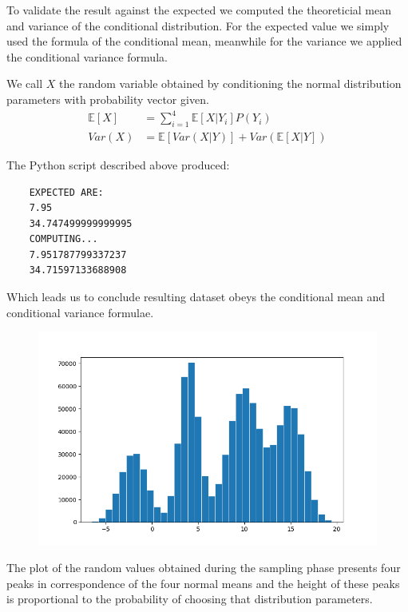 \documentclass[10pt,a4paper]{article}
\begin{document}
To validate the result against the expected we computed the theoreticial mean and variance of the conditional distribution. For the expected value we simply used the formula of the conditional mean, meanwhile for the variance we applied the conditional variance formula.

We call \(X\) the random variable obtained by conditioning the normal distribution parameters with probability vector given.
\begin{align*}
  \mathbb{E}[X] &= \sum^{4}_{i=1}{\mathbb{E}[X|Y_{i}]P(Y_{i})}\\
  Var(X) &= \mathbb{E}[Var(X|Y)] + Var(\mathbb{E}[X|Y])
\end{align*}

The Python script described above produced:
\begin{center}
  \begin{lstlisting}
    EXPECTED ARE:
    7.95
    34.747499999999995
    COMPUTING...
    7.951787799337237
    34.71597133688908
  \end{lstlisting}
\end{center}
Which leads us to conclude resulting dataset obeys the conditional mean and conditional variance formulae.

\begin{figure}[h]
  \centering
  \includegraphics[scale=0.4]{exercise-1-hist.png}
\end{figure}

The plot of the random values obtained during the sampling phase presents four peaks in correspondence of the four normal means and the height of these peaks is proportional to the probability of choosing that distribution parameters.
\end{document}
